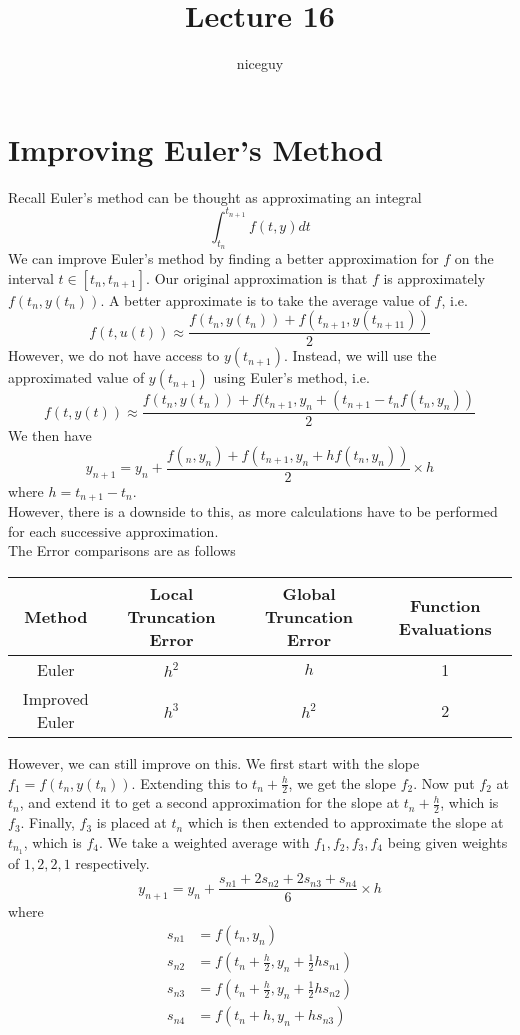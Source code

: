 \documentclass[12pt]{article}
\author{niceguy}
\title{Lecture 16}
\begin{document}
\maketitle

\section{Improving Euler's Method}
Recall Euler's method can be thought as approximating an integral
$$\int_{t_n}^{t_{n+1}} f(t,y)dt$$
We can improve Euler's method by finding a better approximation for $f$ on the interval $t \in [t_n,t_{n+1}]$. Our original approximation is that $f$ is approximately $f(t_n,y(t_n))$. A better approximate is to take the average value of $f$, i.e.
$$f(t,u(t)) \approx \frac{f(t_n,y(t_n)) + f(t_{n+1}, y(t_{n+11}))}{2}$$
However, we do not have access to $y(t_{n+1})$. Instead, we will use the approximated value of $y(t_{n+1})$ using Euler's method, i.e.
$$f(t,y(t)) \approx \frac{f(t_n,y(t_n)) + f(t_{n+1}, y_n + (t_{n+1}-t_nf(t_n,y_n))}{2}$$
We then have
$$y_{n+1} = y_n + \frac{f(_n,y_n) + f(t_{n+1}, y_n + hf(t_n,y_n))}{2} \times h$$
where $h = t_{n+1} - t_n$. \\
However, there is a downside to this, as more calculations have to be performed for each successive approximation. \\
The Error comparisons are as follows
\begin{center}
\begin{tabular}{|c||c|c|c|}
	\hline
	Method & Local Truncation Error & Global Truncation Error & Function Evaluations \\
	\hline \hline
	Euler & $h^2$ & $h$ & 1 \\
	\hline
	Improved Euler & $h^3$ & $h^2$ & 2 \\
	\hline
\end{tabular}
\end{center}
However, we can still improve on this. We first start with the slope $f_1 = f(t_n,y(t_n))$. Extending this to $t_n + \frac{h}{2}$, we get the slope $f_2$. Now put $f_2$ at $t_n$, and extend it to get a second approximation for the slope at $t_n + \frac{h}{2}$, which is $f_3$. Finally, $f_3$ is placed at $t_n$ which is then extended to approximate the slope at $t_{n_1}$, which is $f_4$. We take a weighted average with $f_1, f_2, f_3, f_4$ being given weights of $1, 2, 2, 1$ respectively.
$$y_{n+1} = y_n + \frac{s_{n1} + 2s_{n2} + 2s_{n3} + s_{n4}}{6} \times h$$
where
\begin{align*}
	s_{n1} &= f(t_n,y_n) \\
s_{n2} &= f(t_n + \frac{h}{2}, y_n + \frac{1}{2}hs_{n1}) \\
s_{n3} &= f(t_n + \frac{h}{2}, y_n + \frac{1}{2}hs_{n2}) \\
s_{n4} &= f(t_n + h, y_n + hs_{n3})
\end{align*}
\end{document}
